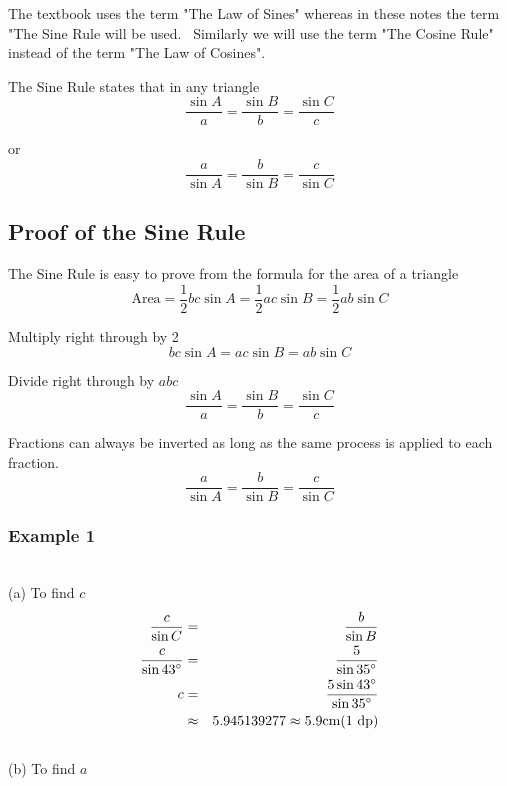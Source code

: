 The textbook uses the term "The Law of Sines" whereas in these notes the term
"The Sine Rule will be used. \ Similarly we will use the term "The Cosine Rule" instead of the term "The Law of
Cosines". 

The Sine Rule states that in any triangle
\begin{equation*}\frac{\sin  A}{a} =\frac{\sin  B}{b} =\frac{\sin  C}{c}
\end{equation*}

or
\begin{equation*}\frac{a}{\sin  A} =\frac{b}{\sin  B} =\frac{c}{\sin  C}
\end{equation*}

\subsection{Proof of the Sine Rule}
The Sine Rule is easy to prove from the formula for the area of a triangle
\begin{equation*}\text{Area} =\frac{1}{2} b c \sin  A =\frac{1}{2} a c \sin  B =\frac{1}{2} a b \sin  C
\end{equation*}

Multiply right through by 2
\begin{equation*}b c \sin  A =a c \sin  B =a b \sin  C
\end{equation*}

Divide right through by $a b c$
\begin{equation*}\frac{\sin  A}{a} =\frac{\sin  B}{b} =\frac{\sin  C}{c}
\end{equation*}

Fractions can always be inverted as long as the same process is applied to each fraction.
\begin{equation*}\frac{a}{\sin  A} =\frac{b}{\sin  B} =\frac{c}{\sin  C}
\end{equation*}

\subsubsection{Example 1}
   
\setlength\fboxrule{0in}\setlength\fboxsep{0.2in}
\\\relax (a) To find $c$
\begin{align*}\frac{c}{\sin  C} &  = & \frac{b}{\sin  B} \\
\frac{c}{\sin  43 \mbox{{\ensuremath{{}^\circ}}}} &  = & \frac{5}{\sin  35 \mbox{{\ensuremath{{}^\circ}}}} \\
c &  = & \frac{5 \sin  43 \mbox{{\ensuremath{{}^\circ}}}}{\sin  35 \mbox{{\ensuremath{{}^\circ}}}} \\
 &  \approx  & 5.945139277 \approx 5.9 \mbox{cm}\text{(1 dp)}\end{align*} \\\relax (b) To find $a$ 


